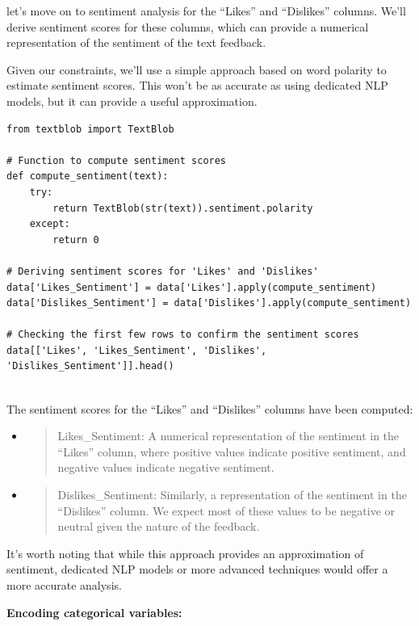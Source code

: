 \documentclass[
]{article}
\begin{document}
let's move on to sentiment analysis for the ``Likes'' and ``Dislikes''
columns. We'll derive sentiment scores for these columns, which can
provide a numerical representation of the sentiment of the text
feedback.

Given our constraints, we'll use a simple approach based on word
polarity to estimate sentiment scores. This won't be as accurate as
using dedicated NLP models, but it can provide a useful approximation.

\begin{verbatim}
from textblob import TextBlob

# Function to compute sentiment scores
def compute_sentiment(text):
    try:
        return TextBlob(str(text)).sentiment.polarity
    except:
        return 0

# Deriving sentiment scores for 'Likes' and 'Dislikes'
data['Likes_Sentiment'] = data['Likes'].apply(compute_sentiment)
data['Dislikes_Sentiment'] = data['Dislikes'].apply(compute_sentiment)

# Checking the first few rows to confirm the sentiment scores
data[['Likes', 'Likes_Sentiment', 'Dislikes', 'Dislikes_Sentiment']].head()
 
\end{verbatim}

The sentiment scores for the ``Likes'' and ``Dislikes'' columns have
been computed:

\begin{itemize}
\item
  \begin{quote}
  Likes\_Sentiment: A numerical representation of the sentiment in the
  ``Likes'' column, where positive values indicate positive sentiment,
  and negative values indicate negative sentiment.
  \end{quote}
\item
  \begin{quote}
  Dislikes\_Sentiment: Similarly, a representation of the sentiment in
  the ``Dislikes'' column. We expect most of these values to be negative
  or neutral given the nature of the feedback.
  \end{quote}
\end{itemize}

It's worth noting that while this approach provides an approximation of
sentiment, dedicated NLP models or more advanced techniques would offer
a more accurate analysis.

\textbf{Encoding categorical variables:}
\end{document}
